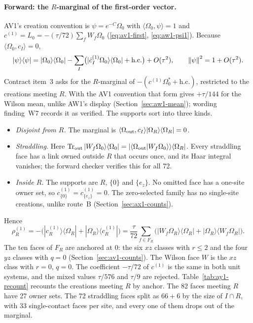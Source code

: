 \paragraph{Forward: the \texorpdfstring{$R$}{R}-marginal of the first-order vector.}
AV1's creation convention is $\psi=e^{-C}\Omega_0$ with
$\langle\Omega_0,\psi\rangle=1$ and $c^{(1)}=L_0=-(\tau/72)\sum_fW_f\Omega_0$
(\eqref{eq:av1-first}, \eqref{eq:aw1-psi1}). Because
$\langle\Omega_0,c_I\rangle=0$,
\[
 |\psi\rangle\langle\psi|=|\Omega_0\rangle\langle\Omega_0|
 -\sum_I\bigl(|\hat c^{(1)}_I\Omega_0\rangle\langle\Omega_0|+\text{h.c.}\bigr)+O(\tau^2),
 \qquad\left\lVert\psi\right\rVert^2=1+O(\tau^2).
\]
Contract item~3 asks for the $R$-marginal of
$-(c^{(1)}\Omega_0^*+\text{h.c.})$, restricted to the creations meeting $R$.
With the AV1 convention that form gives $+\tau/144$ for the Wilson mean,
unlike AW1's display (Section~\ref{sec:aw1-mean}); wording finding~W7
records it as verified. The supports sort into three kinds.
\begin{itemize}
\item \emph{Disjoint from $R$.} The marginal is
 $\langle\Omega_{\rm out},c_I\rangle|\Omega_R\rangle\langle\Omega_R|=0$.
\item \emph{Straddling.} Here
 $\operatorname{Tr}_{\rm out}|W_f\Omega_0\rangle\langle\Omega_0|
 =|\langle\Omega_{\rm out}|W_f\Omega_0\rangle\rangle\langle\Omega_R|$. Every
 straddling face has a link owned outside $R$ that occurs once, and its Haar
 integral vanishes; the forward checker verifies this for all 72.
\item \emph{Inside $R$.} The supports are $R$, $\{0\}$ and $\{e_z\}$. No
 omitted face has a one-site owner set, so
 $c^{(1)}_{\{0\}}=c^{(1)}_{\{e_z\}}=0$. The zero-selected family has no
 single-site creations, unlike route~B (Section~\ref{sec:ax1-counts}).
\end{itemize}
Hence
\begin{equation}
 \boxed{\;\rho^{(1)}_R=-\bigl(|c^{(1)}_R\rangle\langle\Omega_R|+|\Omega_R\rangle\langle c^{(1)}_R|\bigr)
 =\frac\tau{72}\sum_{f\in F_R}\bigl(|W_f\Omega_R\rangle\langle\Omega_R|
 +|\Omega_R\rangle\langle W_f\Omega_R|\bigr).\;}
 \label{eq:ay1-rho1}
\end{equation}
The ten faces of $F_R$ are anchored at $0$: the six $xz$ classes with $r\le2$
and the four $yz$ classes with $q=0$ (Section~\ref{sec:av1-counts}). The
Wilson face $W$ is the $xz$ class with $r=0$, $q=0$. The coefficient
$-\tau/72$ of $c^{(1)}$ is the same in both unit systems, and the mixed values
$\tau/576$ and $\tau/9$ are rejected. Table~\ref{tab:ay1-recount} recounts the
creations meeting $R$ by anchor. The 82 faces meeting $R$ have 27 owner sets.
The 72 straddling faces split as $66+6$ by the size of $I\cap R$, with 33
single-contact faces per site, and every one of them drops out of the
marginal.


